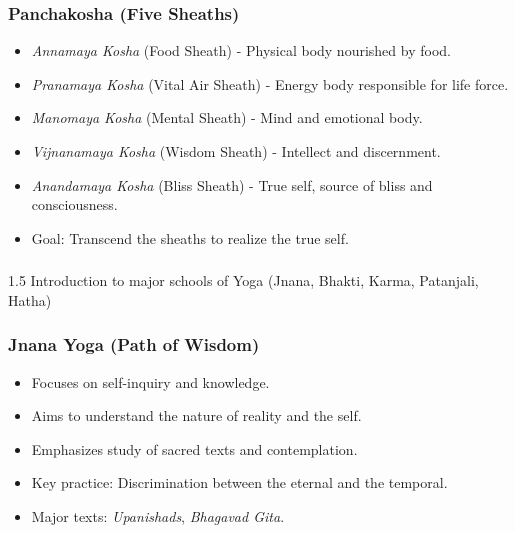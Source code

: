 \begin{frame}[fragile]\frametitle{Panchakosha (Five Sheaths)}

      \begin{itemize}
		\item \textit{Annamaya Kosha} (Food Sheath) - Physical body nourished by food.
		\item \textit{Pranamaya Kosha} (Vital Air Sheath) - Energy body responsible for life force.
		\item \textit{Manomaya Kosha} (Mental Sheath) - Mind and emotional body.
		\item \textit{Vijnanamaya Kosha} (Wisdom Sheath) - Intellect and discernment.
		\item \textit{Anandamaya Kosha} (Bliss Sheath) - True self, source of bliss and consciousness.
		\item Goal: Transcend the sheaths to realize the true self.
	  \end{itemize}

\end{frame}


\begin{frame}[fragile]\frametitle{}
\begin{center}
{\Large 1.5 Introduction to major schools of Yoga (Jnana, Bhakti, Karma, Patanjali, Hatha)}
\end{center}
\end{frame}

\begin{frame}[fragile]\frametitle{Jnana Yoga (Path of Wisdom)}

      \begin{itemize}
		\item Focuses on self-inquiry and knowledge.
		\item Aims to understand the nature of reality and the self.
		\item Emphasizes study of sacred texts and contemplation.
		\item Key practice: Discrimination between the eternal and the temporal.
		\item Major texts: \textit{Upanishads}, \textit{Bhagavad Gita}.
	  \end{itemize}

\end{frame}


